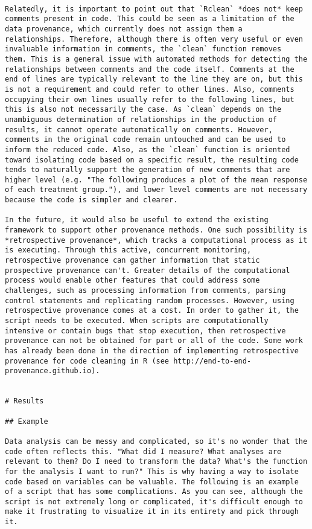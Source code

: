 \documentclass[]{article}
\begin{document}
\begin{verbatim}

Relatedly, it is important to point out that `Rclean` *does not* keep
comments present in code. This could be seen as a limitation of the
data provenance, which currently does not assign them a
relationships. Therefore, although there is often very useful or even
invaluable information in comments, the `clean` function removes
them. This is a general issue with automated methods for detecting the
relationships between comments and the code itself. Comments at the
end of lines are typically relevant to the line they are on, but this
is not a requirement and could refer to other lines. Also, comments
occupying their own lines usually refer to the following lines, but
this is also not necessarily the case. As `clean` depends on the
unambiguous determination of relationships in the production of
results, it cannot operate automatically on comments. However,
comments in the original code remain untouched and can be used to
inform the reduced code. Also, as the `clean` function is oriented
toward isolating code based on a specific result, the resulting code
tends to naturally support the generation of new comments that are
higher level (e.g. "The following produces a plot of the mean response
of each treatment group."), and lower level comments are not necessary
because the code is simpler and clearer.

In the future, it would also be useful to extend the existing
framework to support other provenance methods. One such possibility is
*retrospective provenance*, which tracks a computational process as it
is executing. Through this active, concurrent monitoring,
retrospective provenance can gather information that static
prospective provenance can't. Greater details of the computational
process would enable other features that could address some
challenges, such as processing information from comments, parsing
control statements and replicating random processes. However, using
retrospective provenance comes at a cost. In order to gather it, the
script needs to be executed. When scripts are computationally
intensive or contain bugs that stop execution, then retrospective
provenance can not be obtained for part or all of the code. Some work
has already been done in the direction of implementing retrospective
provenance for code cleaning in R (see http://end-to-end-provenance.github.io).


# Results

## Example

Data analysis can be messy and complicated, so it's no wonder that the
code often reflects this. "What did I measure? What analyses are
relevant to them? Do I need to transform the data? What's the function
for the analysis I want to run?" This is why having a way to isolate
code based on variables can be valuable. The following is an example
of a script that has some complications. As you can see, although the
script is not extremely long or complicated, it's difficult enough to
make it frustrating to visualize it in its entirety and pick through
it.



\end{verbatim}
\end{document}
